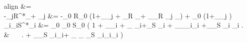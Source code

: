 \documentclass[12pt, titlepage, twoside, openright]{report}
\begin{document}
	 \begin{empheq}[left=\empheqlbrace]{align}
	  &=  \\
	 -\gamma_{j\mu}R^*_\mu + \alpha_{\mu j} &= -\gamma_0 R_0 \left(1+\epsilon_\gamma \tilde{\gamma}_{j\mu} + \epsilon_R  _\mu + \epsilon_\gamma \epsilon_R  \tilde{\gamma}_{j\mu} _\mu\right) + \alpha_0 \left(1+\epsilon_\alpha \tilde{\alpha}_{\mu j}  \right) \\
	 \sigma_{i\nu}\gamma_{i\nu}S^*_i &= \sigma_0 \gamma_0 S_0 \left( 1 + \epsilon_\sigma \tilde{\sigma}_{i\nu} + \epsilon_{\gamma}  \tilde{\gamma}_{i\nu}+\epsilon_S  _i + \epsilon_\sigma \epsilon_\gamma  \tilde{\sigma}_{i\nu}\tilde{\gamma}_{i\nu}  +\epsilon_\sigma \epsilon_S  \tilde{\sigma}_{i\nu} _i  \right. \nonumber \\
	  & \ \ \  \left. + \epsilon_\gamma \epsilon_S  \tilde{\gamma}_{i\nu}_i+ \epsilon_{\sigma} \epsilon_{\gamma} \epsilon_{S}  \tilde{\sigma}_{i\nu}\tilde{\gamma}_{i\nu}_i \right)
	 \end{empheq}
\end{document}
